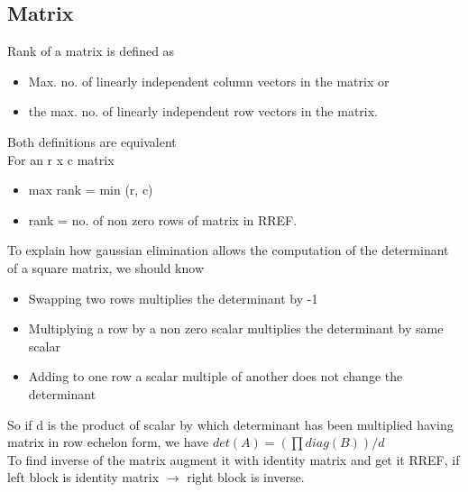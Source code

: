 \documentclass[8pt, a4paper, oneside, twocolumn]{extarticle}
\begin{document}
\subsection{Matrix}
Rank of a matrix is defined as 
\begin{itemize}
    \item Max. no. of linearly independent column vectors in the matrix or
    \item the max. no. of linearly independent row vectors in the matrix.
\end{itemize}
Both definitions are equivalent
\\For an r x c matrix
\begin{itemize}
    \item max rank = min (r, c)
    \item rank = no. of non zero rows of matrix in RREF.
\end{itemize}
To explain how gaussian elimination allows the computation of the determinant of a square matrix, we should know
\begin{itemize}
    \item Swapping two rows multiplies the determinant by -1
    \item Multiplying a row by a non zero scalar multiplies the determinant by same scalar
    \item Adding to one row a scalar multiple of another does not change the determinant
\end{itemize}
So if d is the product of scalar by which determinant has been multiplied having matrix in row echelon form, we have $det(A) = (\prod diag(B))/d$
\\To find inverse of the matrix augment it with identity matrix and get it RREF, if left block is identity matrix $\rightarrow$ right block is inverse. 
\end{document}
